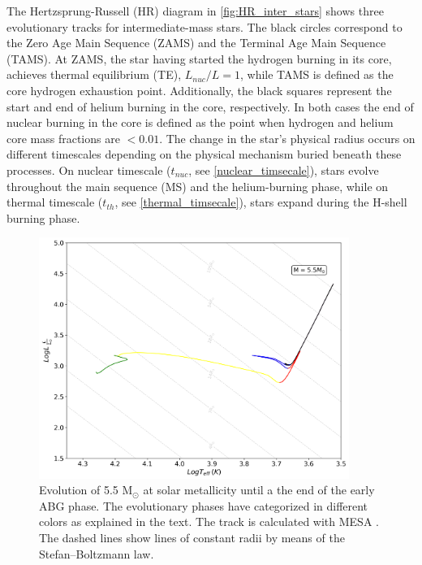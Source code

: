 The Hertzsprung-Russell (HR) diagram in \cref{fig:HR_inter_stars} shows three evolutionary tracks for intermediate-mass stars. The black circles correspond to the Zero Age Main Sequence (ZAMS) and the Terminal Age Main Sequence (TAMS). At ZAMS, the star having started the hydrogen burning in its core, achieves thermal equilibrium (TE), $L_{nuc}/L =1$, while TAMS is defined as the core hydrogen exhaustion point. Additionally, the black squares represent the start and end of helium burning in the core, respectively. In both cases the end of nuclear burning in the core is defined as the point when hydrogen and helium core mass fractions are $< 0.01$. The change in the star's physical radius occurs on different timescales depending on the physical mechanism buried beneath these processes. On nuclear timescale ($t_{nuc}$, see \eqref{nuclear_timsecale}), stars evolve throughout the main sequence (MS) and the helium-burning phase, while on thermal timescale ($t_{th}$, see \eqref{thermal_timsecale}), stars expand during the H-shell burning phase.

\begin{figure}[H]
    \centering
    \includegraphics[width=0.9\textwidth]{Thesis/graphs/HR_evolution.pdf}
    \caption{Evolution of 5.5 M$_{\odot}$ at solar metallicity until a the end of the early ABG phase. The evolutionary phases have categorized in different colors as explained in the text. The track is calculated with MESA \citep{paxton2010modules,paxton2013modules,paxton2015modules,paxton2019modules}. The dashed lines show lines of constant radii by means of the Stefan–Boltzmann law.}
    \label{fig:HR_evolution}
\end{figure}

